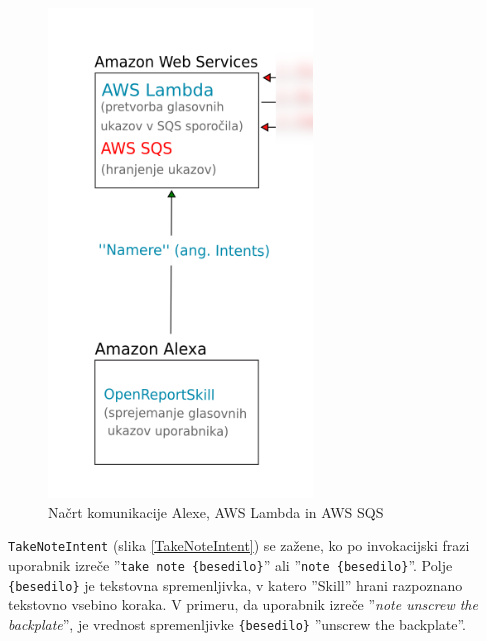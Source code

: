 \documentclass[a4paper, 12pt]{book}
\begin{document}
\begin{figure}[H]
\begin{center}
\includegraphics[width=7cm]{plan_alexa_sqs}
\end{center}
\caption{Načrt komunikacije Alexe, AWS Lambda in AWS SQS}
\label{plan_alexa_sqs}
\end{figure}

\texttt{TakeNoteIntent} (slika \ref{TakeNoteIntent}) se zažene, ko po invokacijski frazi uporabnik izreče ''\texttt{take note \{besedilo\}}'' ali ''\texttt{note \{besedilo\}}''.
Polje \texttt{\{besedilo\}} je tekstovna spremenljivka, v katero ''Skill'' hrani razpoznano tekstovno vsebino koraka.
V primeru, da uporabnik izreče ''\textit{note unscrew the backplate}'', je vrednost spremenljivke \texttt{\{besedilo\}} ''unscrew the backplate''.
\end{document}
